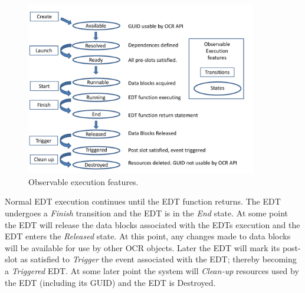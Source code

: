 \begin{figure}
\centering
 \includegraphics[width=0.9\textwidth]{EDT_exec}
\caption{Observable execution features.}
\label{fig:EDTexec}
\end{figure}

Normal EDT execution continues until the EDT function returns.   The EDT undergoes
a \emph{Finish} transition and the EDT is in the \emph{End} state.
At some point the EDT will release the data blocks associated with the EDTs execution and the
EDT enters the \emph{Released} state.   At this point, any changes made to data blocks will
be available for use by other OCR objects. Later the EDT will
mark its post-slot as satisfied to \emph{Trigger} the event
associated with the EDT; thereby becoming a \emph{Triggered} EDT.  At some later point the
system will \emph{Clean-up} resources used by the EDT (including its GUID) and
the EDT is Destroyed.

